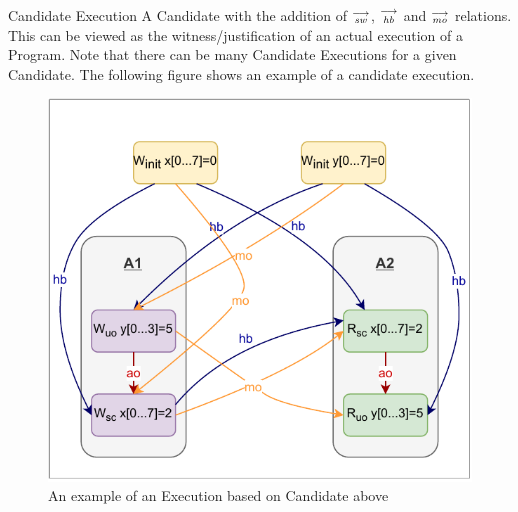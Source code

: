     
    \begin{definition}{Candidate Execution}
        A Candidate with the addition of $\stackrel{\longrightarrow}{_\textit{sw}}$, $\stackrel{\longrightarrow}{_\textit{hb}}$ and $\stackrel{\longrightarrow}{_\textit{mo}}$ relations. This can be viewed as the witness/justification of an actual execution of a Program. Note that there can be many Candidate Executions for a given Candidate. The following figure shows an example of a candidate execution. 
        
        \begin{figure}[H]
            \centering
            \includegraphics[scale=0.7]{ECMAScriptMemoryModel/execution.pdf}
            \caption{An example of an Execution based on Candidate above}
            \label{fig:my_label}
        \end{figure}
        
    \end{definition}
    
    
